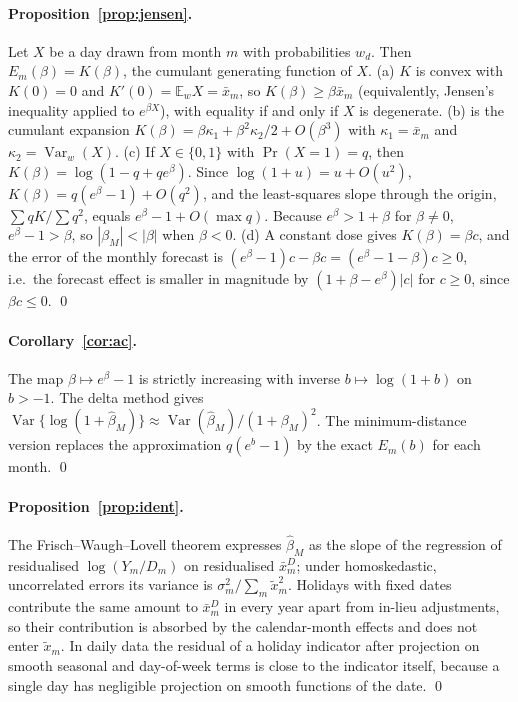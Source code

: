 \documentclass{article}
\theoremstyle{plain}
\theoremstyle{definition}
\theoremstyle{remark}
\newcommand{\E}{\mathbb{E}}
\begin{document}
\paragraph{Proposition~\ref{prop:jensen}.} Let $X$ be a day drawn from month $m$ with probabilities $w_d$. Then $E_m(\beta)=K(\beta)$, the cumulant generating function of $X$. (a) $K$ is convex with $K(0)=0$ and $K'(0)=\E_w X=\bar x_m$, so $K(\beta)\ge\beta\bar x_m$ (equivalently, Jensen's inequality applied to $e^{\beta X}$), with equality if and only if $X$ is degenerate. (b) is the cumulant expansion $K(\beta)=\beta\kappa_1+\beta^2\kappa_2/2+O(\beta^3)$ with $\kappa_1=\bar x_m$ and $\kappa_2=\operatorname{Var}_w(X)$. (c) If $X\in\{0,1\}$ with $\Pr(X=1)=q$, then $K(\beta)=\log(1-q+qe^{\beta})$. Since $\log(1+u)=u+O(u^2)$, $K(\beta)=q(e^{\beta}-1)+O(q^2)$, and the least-squares slope through the origin, $\sum qK/\sum q^2$, equals $e^{\beta}-1+O(\max q)$. Because $e^{\beta}>1+\beta$ for $\beta\ne0$, $e^{\beta}-1>\beta$, so $|\beta_M|<|\beta|$ when $\beta<0$. (d) A constant dose gives $K(\beta)=\beta c$, and the error of the monthly forecast is $(e^{\beta}-1)c-\beta c=(e^{\beta}-1-\beta)c\ge0$, i.e.\ the forecast effect is smaller in magnitude by $(1+\beta-e^{\beta})|c|$ for $c\ge0$, since $\beta c\le0$. \qed

\paragraph{Corollary~\ref{cor:ac}.} The map $\beta\mapsto e^{\beta}-1$ is strictly increasing with inverse $b\mapsto\log(1+b)$ on $b>-1$. The delta method gives $\operatorname{Var}\{\log(1+\hat\beta_M)\}\approx\operatorname{Var}(\hat\beta_M)/(1+\beta_M)^2$. The minimum-distance version replaces the approximation $q(e^{b}-1)$ by the exact $E_m(b)$ for each month. \qed

\paragraph{Proposition~\ref{prop:ident}.} The Frisch--Waugh--Lovell theorem expresses $\hat\beta_M$ as the slope of the regression of residualised $\log(Y_m/D_m)$ on residualised $\bar x^D_m$; under homoskedastic, uncorrelated errors its variance is $\sigma_m^2/\sum_m\tilde x_m^2$. Holidays with fixed dates contribute the same amount to $\bar x^D_m$ in every year apart from in-lieu adjustments, so their contribution is absorbed by the calendar-month effects and does not enter $\tilde x_m$. In daily data the residual of a holiday indicator after projection on smooth seasonal and day-of-week terms is close to the indicator itself, because a single day has negligible projection on smooth functions of the date. \qed
\end{document}
